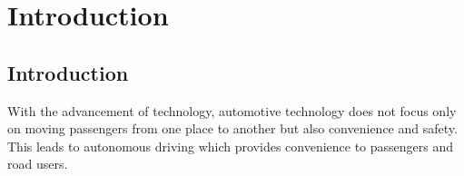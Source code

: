 \chapter{Introduction}

\section{Introduction}

With the advancement of technology, automotive technology does not focus only on moving passengers from one place to another but also convenience and safety. This leads to autonomous driving which provides convenience to passengers and road users.